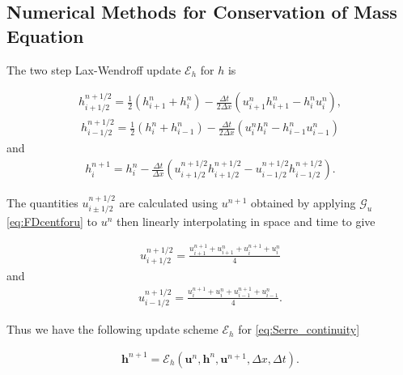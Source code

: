 \documentclass[times]{elsarticle}
\begin{document}
\subsection{Numerical Methods for Conservation of Mass Equation}
\label{section:}
The two step Lax-Wendroff update $\mathcal{E}_h$ for $h$ is
\begin{linenomath*}
	\begin{gather*}
	h^{n + 1/2}_{i+ 1/2} = \frac{1}{2}\left(h^{n}_{i+1} + h^{n}_i\right) - \frac{\Delta t}{2\Delta x}\left(u^n_{i+1}h^n_{i+1} - h^n_{i}u^n_{i}\right),
	\end{gather*}
	\begin{gather*}
	h^{n + 1/2}_{i- 1/2} = \frac{1}{2}\left(h^{n}_{i} + h^{n}_{i-1}\right) - \frac{\Delta t}{2\Delta x}\left(u^n_{i}h^n_{i} - h^n_{i-1}u^n_{i-1}\right)
	\end{gather*}
	and
	\begin{gather*}
	h^{n+1}_i = h^{n}_i - \frac{\Delta t}{\Delta x}\left(u^{n + 1/2}_{i+ 1/2}h^{n + 1/2}_{i+ 1/2} - u^{n + 1/2}_{i- 1/2}h^{n + 1/2}_{i- 1/2}\right).
	\label{eq:LW4h}
	\end{gather*}
\end{linenomath*}
The quantities $u^{n + 1/2}_{i \pm 1/2}$ are calculated using $u^{n+1}$ obtained by applying $\mathcal{G}_u$ \eqref{eq:FDcentforu} to $u^n$ then linearly interpolating in space and time to give
\begin{linenomath*}
	\begin{gather*}
	u^{n + 1/2}_{i+ 1/2} = \frac{u^{n+1}_{i+1} + u^{n}_{i+1} + u^{n+1}_{i} + u^{n}_{i} }{4}
	\end{gather*}
	and
	\begin{gather*}
	u^{n + 1/2}_{i- 1/2} = \frac{u^{n+1}_{i} + u^{n}_{i} + u^{n+1}_{i-1}+ u^{n}_{i-1} }{4}.
	\end{gather*}
\end{linenomath*}
Thus we have the following update scheme $\mathcal{E}_h$ for \eqref{eq:Serre_continuity}
\begin{linenomath*}
	\begin{gather}
	\boldsymbol{h}^{n+1} = \mathcal{E}_h\left(\boldsymbol{u}^n,\boldsymbol{h}^n,\boldsymbol{u}^{n+1}, \Delta x, \Delta t \right). 
	\label{eq:LWupdateh}
	\end{gather}
\end{linenomath*}
\end{document}
